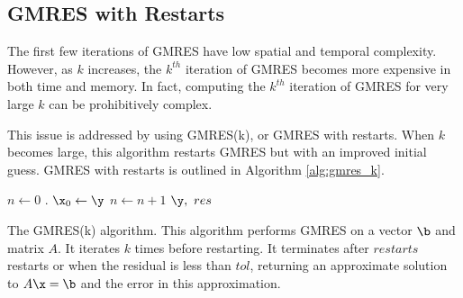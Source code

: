 \subsection*{GMRES with Restarts} %

The first few iterations of GMRES have low spatial and temporal complexity.
However, as $k$ increases, the $k^{th}$ iteration of GMRES becomes more expensive in both time and memory.
In fact, computing the $k^{th}$ iteration of GMRES for very large $k$ can be prohibitively complex.

This issue is addressed by using GMRES(k), or GMRES with restarts.
When $k$ becomes large, this algorithm restarts GMRES but with an improved initial guess.
GMRES with restarts is outlined in Algorithm \ref{alg:gmres_k}.

\begin{algorithm}
\begin{algorithmic}[1]
  \State $n \gets 0$ 
	.
    \State $\x_0 \gets \y$
    \State $n \gets n + 1$
    \EndWhile
    \State {} $\y, \,\, res$		
\EndProcedure
\end{algorithmic}
\caption{The GMRES(k) algorithm. This algorithm performs GMRES on a vector $\b$ and matrix $A$. It iterates $k$ times before restarting.
It terminates after $restarts$ restarts or when the residual is less than $tol$, returning an approximate solution to $A\x=\b$ and the error in this approximation. }
\label{alg:gmres_k}
\end{algorithm}

